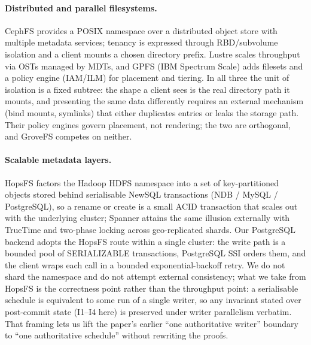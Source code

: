 \documentclass[numberedsection,acmtos]{acmart}
\begin{document}
\paragraph{Distributed and parallel filesystems.}
CephFS \citep{ceph} provides a POSIX namespace over a distributed object store
with multiple metadata services; tenancy is expressed through RBD/subvolume
isolation and a client mounts a chosen directory prefix. Lustre \citep{lustre}
scales throughput via OSTs managed by MDTs, and GPFS (IBM Spectrum Scale)
\citep{gpfs} adds filesets and a policy engine (IAM/ILM) for placement and
tiering. In all three the unit of isolation is a
fixed subtree: the shape a client sees is the real directory path it
mounts, and presenting the same data differently requires an external
mechanism (bind mounts, symlinks) that either duplicates entries or leaks
the storage path. Their policy engines govern placement, not rendering;
the two are orthogonal, and GroveFS competes on neither.

\paragraph{Scalable metadata layers.}
HopsFS \citep{hopsfs} factors the Hadoop HDFS namespace into a set of
key-partitioned objects stored behind serialisable NewSQL transactions
(NDB / MySQL / PostgreSQL), so a rename or create is a small ACID
transaction that scales out with the underlying cluster; Spanner \citep{spanner} attains
the same illusion externally with TrueTime and two-phase locking across
geo-replicated shards. Our PostgreSQL backend adopts the HopsFS route
within a single cluster: the write path is a bounded pool of
SERIALIZABLE transactions, PostgreSQL SSI \citep{ports2012} orders them, and
the client wraps each call in a bounded exponential-backoff retry. We do not
shard the namespace and do not attempt external consistency; what we take
from HopsFS is the correctness point rather than the throughput point: a
serialisable schedule is equivalent to some run of a single writer, so
any invariant stated over post-commit state (I1--I4 here) is preserved under
writer parallelism verbatim. That framing lets us lift the paper's earlier
``one authoritative writer'' boundary to ``one authoritative schedule'' without
rewriting the proofs.
\end{document}
